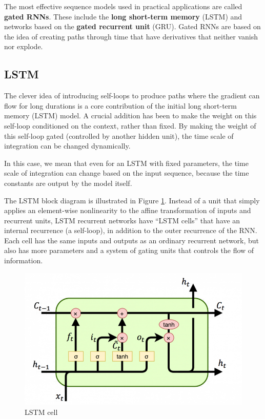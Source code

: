 The most effective sequence models used in practical applications are called \textbf{gated RNNs}. 
These include the \textbf{long short-term memory} (LSTM) and networks based on the \textbf{gated recurrent
    unit} (GRU). Gated RNNs are based on the idea of creating paths through time that have 
derivatives that neither vanish nor explode.

\subsection{LSTM}
The clever idea of introducing self-loops to produce paths where the gradient can flow for long durations 
is a core contribution of the initial long short-term memory (LSTM) model. A crucial addition has been to 
make the weight on this self-loop conditioned on the context, rather than fixed. By making the weight of this 
self-loop gated (controlled by another hidden unit), the time scale of integration can be changed dynamically.

In this case, we mean that even for an LSTM with fixed parameters, the time scale of integration can change 
based on the input sequence, because the time constants are output by the model itself.

The LSTM block diagram is illustrated in Figure \ref{fig:lstm}. Instead of a unit that simply applies an 
element-wise nonlinearity to the affine transformation of inputs and recurrent units, LSTM recurrent networks 
have “LSTM cells” that have an internal recurrence (a self-loop), in addition to the outer recurrence of the 
RNN. Each cell has the same inputs and outputs as an ordinary recurrent network, but also has more parameters 
and a system of gating units that controls the flow of information. 

\begin{figure}[!ht]
    \centering
    \includegraphics[width=0.5\linewidth]{img/RNN/LSTM.png}
    \caption{LSTM cell}
    \label{fig:lstm}
\end{figure}

